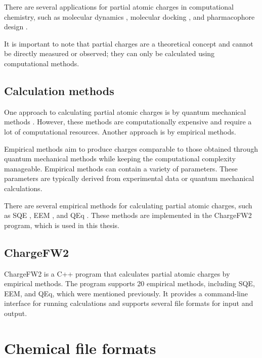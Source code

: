 \documentclass[
  digital,     %
  oneside,     %
  nosansbold,  %
  nocolorbold, %
  lof,         %
  lot,         %
]{fithesis4}
\begin{document}

There are several applications for partial atomic charges in computational chemistry, such as molecular dynamics \cite{MIAO20191049}, molecular docking \cite{docking}, and pharmacophore design \cite{stalke2011meaningful}. \cite{racek2022thesis,schindler2021thesis}

It is important to note that partial charges are a theoretical concept and cannot be directly measured or observed; they can only be calculated using computational methods. \cite{schindler2019thesis} 

\subsection{Calculation methods}
\label{section:calculating_partial_atomic_charges}

One approach to calculating partial atomic charges is by quantum mechanical methods \cite{gupta2015principles}. However, these methods are computationally expensive and require a lot of computational resources. Another approach is by empirical methods.

Empirical methods aim to produce charges comparable to those obtained through quantum mechanical methods while keeping the computational complexity manageable. Empirical methods can contain a variety of parameters. These parameters are typically derived from experimental data or quantum mechanical calculations. \cite{racek2022thesis}

There are several empirical methods for calculating partial atomic charges, such as SQE \cite{nistor2006generalization}, EEM \cite{mortier1986electronegativity}, and QEq \cite{rappe1991charge}. These methods are implemented in the ChargeFW2 \cite{racek2020acc2} program, which is used in this thesis.

\subsection{ChargeFW2}
\label{section:chargfw2}

ChargeFW2 is a C++ program that calculates partial atomic charges by empirical methods. The program supports 20 empirical methods, including SQE, EEM, and QEq, which were mentioned previously. It provides a command-line interface for running calculations and supports several file formats for input and output. \cite{racek2020acc2}

\section{Chemical file formats}
\label{section:chemical_file_formats}
\end{document}
